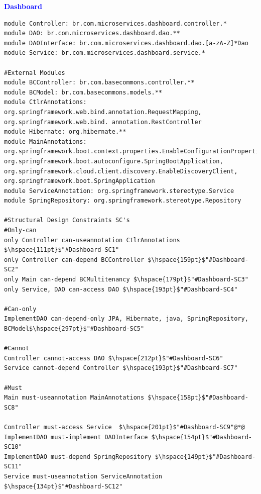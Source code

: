 \documentclass[12pt]{article}
\begin{document}
\newpage
\noindent\textbf{\large{\textcolor{blue}{Dashboard}}}
\label{sec:ApendiceDashboard}


\vspace{0.2cm}
\begin{lstlisting}[style=colorido, caption={\textcolor{blue}{Dashboard microservice's architectural design specification.}},label={list:especArquiteturalDashboard}
]
module Controller: br.com.microservices.dashboard.controller.*
module DAO: br.com.microservices.dashboard.dao.**
module DAOInterface: br.com.microservices.dashboard.dao.[a-zA-Z]*Dao
module Service: br.com.microservices.dashboard.service.*

#External Modules
module BCController: br.com.basecommons.controller.**
module BCModel: br.com.basecommons.models.**
module CtlrAnnotations: org.springframework.web.bind.annotation.RequestMapping, org.springframework.web.bind. annotation.RestController
module Hibernate: org.hibernate.**
module MainAnnotations: org.springframework.boot.context.properties.EnableConfigurationProperties, org.springframework.boot.autoconfigure.SpringBootApplication, org.springframework.cloud.client.discovery.EnableDiscoveryClient, org.springframework.boot.SpringApplication
module ServiceAnnotation: org.springframework.stereotype.Service
module SpringRepository: org.springframework.stereotype.Repository

#Structural Design Constraints SC's
#Only-can
only Controller can-useannotation CtlrAnnotations $\hspace{111pt}$"#Dashboard-SC1"
only Controller can-depend BCController	$\hspace{159pt}$"#Dashboard-SC2"
only Main can-depend BCMultitenancy	$\hspace{179pt}$"#Dashboard-SC3"
only Service, DAO can-access DAO $\hspace{193pt}$"#Dashboard-SC4"

#Can-only
ImplementDAO can-depend-only JPA, Hibernate, java, SpringRepository, BCModel$\hspace{297pt}$"#Dashboard-SC5"

#Cannot
Controller cannot-access DAO $\hspace{212pt}$"#Dashboard-SC6"
Service cannot-depend Controller $\hspace{193pt}$"#Dashboard-SC7"

#Must
Main must-useannotation MainAnnotations	$\hspace{158pt}$"#Dashboard-SC8"

Controller must-access Service	$\hspace{201pt}$"#Dashboard-SC9"@*@
ImplementDAO must-implement DAOInterface $\hspace{154pt}$"#Dashboard-SC10"
ImplementDAO must-depend SpringRepository $\hspace{149pt}$"#Dashboard-SC11"
Service must-useannotation ServiceAnnotation $\hspace{134pt}$"#Dashboard-SC12"
\end{lstlisting}
\end{document}
